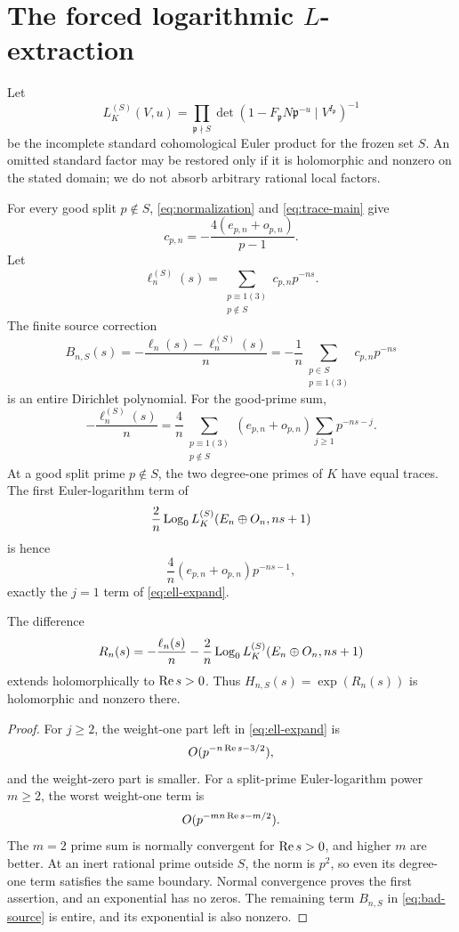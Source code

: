 \section[The forced logarithmic L-extraction]
{The forced logarithmic \(L\)-extraction}\label{sec:logl}

Let
\[
 L_K^{(S)}(V,u)=\prod_{\mathfrak p\nmid S}
 \det(1-F_{\mathfrak p}N\mathfrak p^{-u}
 \mid V^{I_{\mathfrak p}})^{-1}
\]
be the incomplete standard cohomological Euler product for the frozen set
\(S\).  An omitted standard factor may be restored
only if it is holomorphic and nonzero on the stated domain; we do not
absorb arbitrary rational local factors.

For every good split \(p\notin S\), \eqref{eq:normalization} and
\eqref{eq:trace-main} give
\begin{equation}\label{eq:cp-denominator}
 c_{p,n}=-\frac{4(e_{p,n}+o_{p,n})}{p-1}.
\end{equation}
Let
\[
 \ell_n^{(S)}(s)=
 \sum_{\substack{p\equiv1(3)\\p\notin S}}c_{p,n}p^{-ns}.
\]
The finite source correction
\begin{equation}\label{eq:bad-source}
 B_{n,S}(s)=-\frac{\ell_n(s)-\ell_n^{(S)}(s)}n
 =-\frac1n\sum_{\substack{p\in S\\p\equiv1(3)}}
 c_{p,n}p^{-ns}
\end{equation}
is an entire Dirichlet polynomial.  For the good-prime sum,
\begin{equation}\label{eq:ell-expand}
 -\frac{\ell_n^{(S)}(s)}n
 =\frac4n\sum_{\substack{p\equiv1(3)\\p\notin S}}
 (e_{p,n}+o_{p,n})
 \sum_{j\ge1}p^{-ns-j}.
\end{equation}
At a good split prime \(p\notin S\), the two degree-one primes of \(K\)
have equal traces.
The first Euler-logarithm term of
\[
 \frac2n\operatorname{Log}_0 L_K^{(S)}(E_n\oplus O_n,ns+1)
\]
is hence
\[
 \frac4n(e_{p,n}+o_{p,n})p^{-ns-1},
\]
exactly the \(j=1\) term of \eqref{eq:ell-expand}.

\begin{proposition}\label{prop:residual}
The difference
\[
 R_n(s)=-\frac{\ell_n(s)}n
 -\frac2n\operatorname{Log}_0 L_K^{(S)}(E_n\oplus O_n,ns+1)
\]
extends holomorphically to \(\operatorname{Re} s>0\).  Thus
\(H_{n,S}(s)=\exp(R_n(s))\) is holomorphic and nonzero there.
\end{proposition}

\begin{proof}
For \(j\ge2\), the weight-one part left in
\eqref{eq:ell-expand} is
\[
 O(p^{-n\operatorname{Re} s-3/2}),
\]
and the weight-zero part is smaller.  For a split-prime Euler-logarithm
power \(m\ge2\), the worst weight-one term is
\[
 O(p^{-mn\operatorname{Re} s-m/2}).
\]
The \(m=2\) prime sum is normally convergent for \(\operatorname{Re} s>0\), and
higher \(m\) are better.  At an inert rational prime outside \(S\), the
norm is \(p^2\), so even its degree-one term satisfies the same boundary.
Normal convergence proves the first assertion, and an exponential has no
zeros.  The remaining term \(B_{n,S}\) in \eqref{eq:bad-source} is entire,
and its exponential is also nonzero.
\end{proof}

